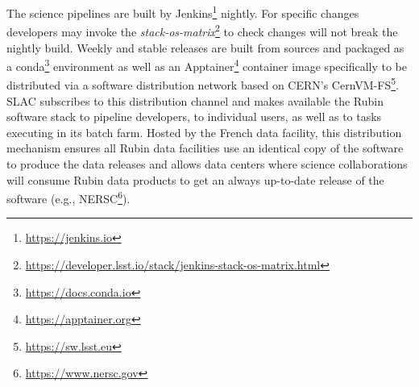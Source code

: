 The science pipelines are built by Jenkins\footnote{\url{https://jenkins.io}} nightly.\cite{2018SPIE10707E..09J}
For specific changes developers may invoke the \emph{stack-os-matrix}\footnote{\url{https://developer.lsst.io/stack/jenkins-stack-os-matrix.html}} to check changes will not break the nightly build.
Weekly and stable releases are built from sources and packaged as a conda\footnote{\url{https://docs.conda.io}} environment as well as an Apptainer\footnote{\url{https://apptainer.org}} container image specifically to be distributed via a software distribution network based on CERN's CernVM-FS\footnote{\url{https://sw.lsst.eu}}.
SLAC subscribes to this distribution channel and makes available the Rubin software stack to pipeline developers, to individual users, as well as to tasks executing in its batch farm.
Hosted by the French data facility, this distribution mechanism ensures all Rubin data facilities use an identical copy of the software to produce the data releases and allows data centers where science collaborations will consume Rubin data products to get an always up-to-date release of the software (e.g., NERSC\footnote{\url{https://www.nersc.gov}}).
